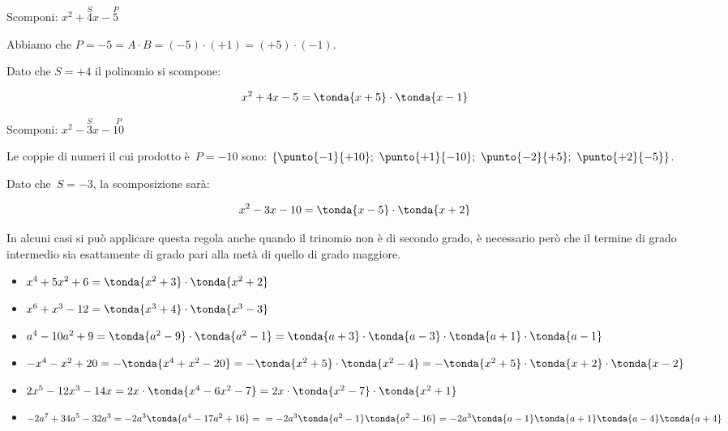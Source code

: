 
\begin{esempio}{}{}
Scomponi: \(x^2+\overset{S}{4}x-\overset{P}{5}\)

Abbiamo che \(P = -5 = A \cdot B = (-5) \cdot (+1) = (+5) \cdot (-1)\).

Dato che \(S = +4\) il polinomio si scompone:

\vspace{-1.0em}
\[x^2+4x-5=\tonda{x+5}\cdot \tonda{x-1}\]
\end{esempio}

\begin{esempio}{}{}
Scomponi: \(x^2-\overset{S}{3}x-\overset{P}{10}\)

Le coppie di numeri il cui prodotto è~\(P=-10\) sono:
\(\{\punto{-1}{+10};~\punto{+1}{-10};~\punto{-2}{+5};~\punto{+2}{-5}\}\).

Dato che~\(S=-3\), la scomposizione sarà:

\vspace{-1.0em}
\[x^2-3x-10=\tonda{x-5}\cdot \tonda{x+2}\]
\end{esempio}

\begin{esempio}{}{}
In alcuni casi si può applicare questa regola anche quando il trinomio
non è di secondo grado, è necessario però che il termine di grado
intermedio sia esattamente di grado pari alla metà di quello di grado
maggiore.

\begin{itemize}[nosep]
\item \(x^4+5x^2+6=\tonda{x^2+3}\cdot \tonda{x^2+2}\)
\item \(x^6+x^3-12=\tonda{x^3+4}\cdot \tonda{x^3-3}\)
\item \(a^{4}-10a^{2}+9=\tonda{a^{2}-9}\cdot\tonda{a^{2}-1}=
       \tonda{a+3}\cdot \tonda{a-3}\cdot 
       \tonda{a+1}\cdot\tonda{a-1}\)
\item \(-x^4-x^2+20=-\tonda{x^4+x^2-20}=
       -\tonda{x^2+5}\cdot\tonda{x^2-4}=
       -\tonda{x^2+5}\cdot\tonda{x+2}\cdot \tonda{x-2}\)
\item \(2x^{5}-12x^3-14x=2x\cdot \tonda{x^4-6x^2-7}=2x\cdot%
\tonda{x^2-7}\cdot \tonda{x^2+1}\)
\item \(-2a^{7}+34a^{5}-32a^{3}=-2a^{3}\tonda{a^{4}-17a^{2}+16}=\\
    =-2a^{3}\tonda{a^{2}-1}\tonda{a^{2}-16}
=-2a^{3}\tonda{a-1}\tonda{a+1}\tonda{a-4}\tonda{a+4}\)
\end{itemize}
\end{esempio}



